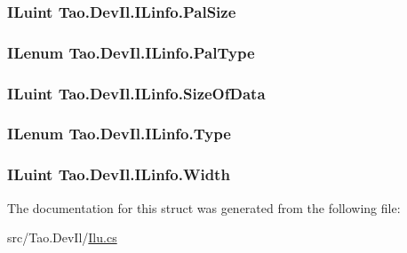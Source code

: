 \label{struct_tao_1_1_dev_il_1_1_i_linfo_a89f5f670454db3c87ed30940f5c8b593}
\hypertarget{struct_tao_1_1_dev_il_1_1_i_linfo_a6aa64d22c0d698c80cb10d67eccc03b7}{
\subsubsection[{PalSize}]{\setlength{\rightskip}{0pt plus 5cm}ILuint {\bf Tao.DevIl.ILinfo.PalSize}}}
\label{struct_tao_1_1_dev_il_1_1_i_linfo_a6aa64d22c0d698c80cb10d67eccc03b7}
\hypertarget{struct_tao_1_1_dev_il_1_1_i_linfo_a648098fe16bceb6aa69546fd9a9f16d0}{
\subsubsection[{PalType}]{\setlength{\rightskip}{0pt plus 5cm}ILenum {\bf Tao.DevIl.ILinfo.PalType}}}
\label{struct_tao_1_1_dev_il_1_1_i_linfo_a648098fe16bceb6aa69546fd9a9f16d0}
\hypertarget{struct_tao_1_1_dev_il_1_1_i_linfo_a8f7425037e9554c9067f0229df9015f8}{
\subsubsection[{SizeOfData}]{\setlength{\rightskip}{0pt plus 5cm}ILuint {\bf Tao.DevIl.ILinfo.SizeOfData}}}
\label{struct_tao_1_1_dev_il_1_1_i_linfo_a8f7425037e9554c9067f0229df9015f8}
\hypertarget{struct_tao_1_1_dev_il_1_1_i_linfo_a4d2d09a8089c9138992f5ec5ab53ab07}{
\subsubsection[{Type}]{\setlength{\rightskip}{0pt plus 5cm}ILenum {\bf Tao.DevIl.ILinfo.Type}}}
\label{struct_tao_1_1_dev_il_1_1_i_linfo_a4d2d09a8089c9138992f5ec5ab53ab07}
\hypertarget{struct_tao_1_1_dev_il_1_1_i_linfo_a909447aa8535479307a83fa1a3675474}{
\subsubsection[{Width}]{\setlength{\rightskip}{0pt plus 5cm}ILuint {\bf Tao.DevIl.ILinfo.Width}}}
\label{struct_tao_1_1_dev_il_1_1_i_linfo_a909447aa8535479307a83fa1a3675474}


The documentation for this struct was generated from the following file:\begin{DoxyCompactItemize}
\item 
src/Tao.DevIl/\hyperlink{_ilu_8cs}{Ilu.cs}\end{DoxyCompactItemize}
